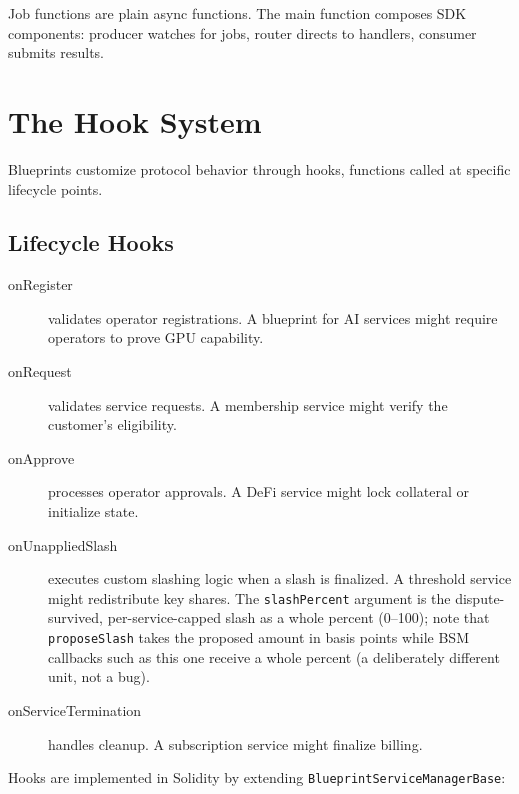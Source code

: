 \documentclass[11pt,a4paper]{article}
\begin{document}
Job functions are plain async functions. The main function composes SDK components: producer watches for jobs, router directs to handlers, consumer submits results.

\section{The Hook System}

Blueprints customize protocol behavior through hooks, functions called at specific lifecycle points.

\subsection{Lifecycle Hooks}

\begin{description}
    \item[onRegister] validates operator registrations. A blueprint for AI services might require operators to prove GPU capability.
    \item[onRequest] validates service requests. A membership service might verify the customer's eligibility.
    \item[onApprove] processes operator approvals. A DeFi service might lock collateral or initialize state.
    \item[onUnappliedSlash] executes custom slashing logic when a slash is finalized. A threshold service might redistribute key shares. The \texttt{slashPercent} argument is the dispute-survived, per-service-capped slash as a whole percent (0--100); note that \texttt{proposeSlash} takes the proposed amount in basis points while BSM callbacks such as this one receive a whole percent (a deliberately different unit, not a bug).
    \item[onServiceTermination] handles cleanup. A subscription service might finalize billing.
\end{description}

Hooks are implemented in Solidity by extending \texttt{BlueprintServiceManagerBase}:
\end{document}

